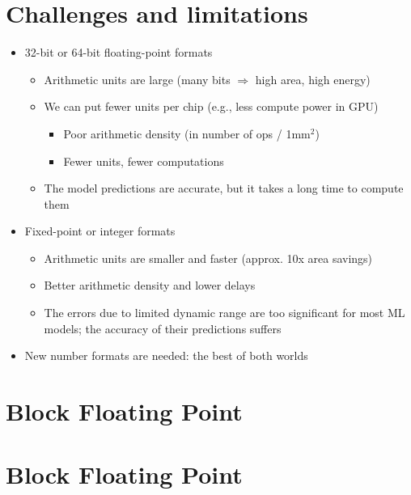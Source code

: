 \documentclass[12pt,openany]{book}
\begin{document}
			      	\section{Challenges and limitations}
			      	\begin{itemize}
			      		\item[] 32-bit or 64-bit floating-point formats
			      		      \begin{itemize}
			      		      	\item[] Arithmetic units are large (many bits $\Rightarrow$ high area, high energy)
			      		      	\item[] We can put fewer units per chip (e.g., less compute power in GPU)
			      		      	      \begin{itemize}
			      		      	      	\item[] Poor arithmetic density (in number of ops / 1mm$^2$)
			      		      	      	\item[] Fewer units, fewer computations
			      		      	      \end{itemize}
			      		      	\item[] The model predictions are accurate, but it takes a long time to compute them
			      		      \end{itemize}
			      		\item[] Fixed-point or integer formats
			      		      \begin{itemize}
			      		      	\item[] Arithmetic units are smaller and faster (approx. 10x area savings)
			      		      	\item[] Better arithmetic density and lower delays
			      		      	\item[] The errors due to limited dynamic range are too significant for most ML models; the accuracy of their predictions suffers
			      		      \end{itemize}
			      		\item[] New number formats are needed: the best of both worlds
			      	\end{itemize}
			      	
			      	
			      	
			      	\section{Block Floating Point}
			      	\section*{Block Floating Point}
			      	
\end{document}
